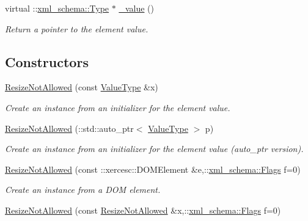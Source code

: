 \begin{DoxyCompactItemize}
virtual ::\hyperlink{namespacexml__schema_ad34e8fd175bf4f9fece6c670b01aa239}{xml\_\-schema::Type} $\ast$ \hyperlink{classopenstack_1_1xml_1_1ResizeNotAllowed_a1bdfd37716b6084e75c0730dd91a7c43}{\_\-value} ()
\begin{DoxyCompactList}\small\item\em Return a pointer to the element value. \item\end{DoxyCompactList}\end{DoxyCompactItemize}
\subsection*{Constructors}
\begin{DoxyCompactItemize}
\item 
\hyperlink{classopenstack_1_1xml_1_1ResizeNotAllowed_a3f25dd47e8e6f09e523ac046547ae009}{ResizeNotAllowed} (const \hyperlink{classopenstack_1_1xml_1_1ResizeNotAllowedAPIFault}{ValueType} \&x)
\begin{DoxyCompactList}\small\item\em Create an instance from an initializer for the element value. \item\end{DoxyCompactList}\item 
\hyperlink{classopenstack_1_1xml_1_1ResizeNotAllowed_a18b672c5ff935315f1067177739d418c}{ResizeNotAllowed} (::std::auto\_\-ptr$<$ \hyperlink{classopenstack_1_1xml_1_1ResizeNotAllowedAPIFault}{ValueType} $>$ p)
\begin{DoxyCompactList}\small\item\em Create an instance from an initializer for the element value (auto\_\-ptr version). \item\end{DoxyCompactList}\item 
\hyperlink{classopenstack_1_1xml_1_1ResizeNotAllowed_a4b2e79399b34bb7e65a418f20e40bbef}{ResizeNotAllowed} (const ::xercesc::DOMElement \&e,::\hyperlink{namespacexml__schema_affb4c227cbd9aa7453dd1dc5a1401943}{xml\_\-schema::Flags} f=0)
\begin{DoxyCompactList}\small\item\em Create an instance from a DOM element. \item\end{DoxyCompactList}\item 
\hyperlink{classopenstack_1_1xml_1_1ResizeNotAllowed_a5e97932cd91a730438cad386e1b51d37}{ResizeNotAllowed} (const \hyperlink{classopenstack_1_1xml_1_1ResizeNotAllowed}{ResizeNotAllowed} \&x,::\hyperlink{namespacexml__schema_affb4c227cbd9aa7453dd1dc5a1401943}{xml\_\-schema::Flags} f=0)

\end{DoxyCompactItemize}
